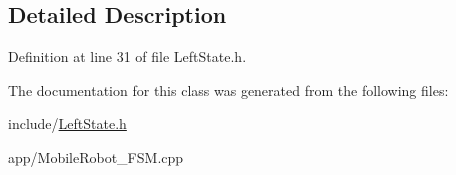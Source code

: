 \subsection{Detailed Description}


Definition at line 31 of file Left\+State.\+h.



The documentation for this class was generated from the following files\+:\begin{DoxyCompactItemize}
\item 
include/\mbox{\hyperlink{_left_state_8h}{Left\+State.\+h}}\item 
app/Mobile\+Robot\+\_\+\+F\+S\+M.\+cpp\end{DoxyCompactItemize}
